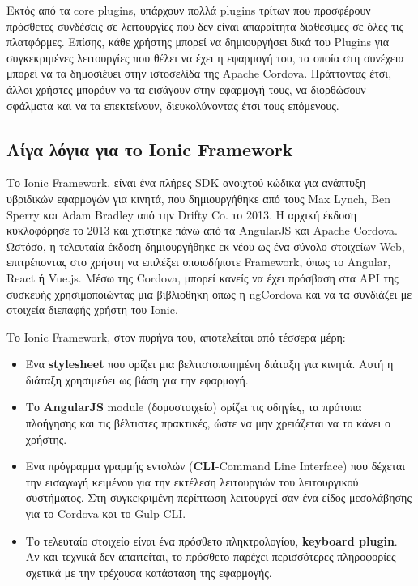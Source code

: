 \documentclass[a4paper,12pt]{article}
\begin{document}
			Εκτός από τα core plugins, υπάρχουν πολλά plugins τρίτων που προσφέρουν πρόσθετες συνδέσεις σε λειτουργίες που δεν είναι 
			απαραίτητα διαθέσιμες σε όλες τις πλατφόρμες. Επίσης, κάθε χρήστης μπορεί να δημιουργήσει δικά του Plugins για συγκεκριμένες λειτουργίες που θέλει να έχει
			η εφαρμογή του, τα οποία στη συνέχεια μπορεί να τα δημοσιέυει στην ιστοσελίδα της Apache Cordova. Πράττοντας έτσι, άλλοι χρήστες μπορόυν να τα εισάγουν
			στην εφαρμογή τους, να διορθώσουν σφάλματα και να τα επεκτείνουν, διευκολύνοντας έτσι τους επόμενους.
		\newpage
		\subsection{Λίγα λόγια για τo Ionic Framework}
			Το Ionic Framework, είναι ένα πλήρες SDK ανοιχτού κώδικα για ανάπτυξη υβριδικών εφαρμογών για κινητά, που δημιουργήθηκε από τους Max Lynch, Ben Sperry και Adam Bradley από την Drifty Co. το 
			2013. Η αρχική έκδοση κυκλοφόρησε το 2013 και χτίστηκε πάνω από τα AngularJS και Apache Cordova. Ωστόσο, η τελευταία έκδοση δημιουργήθηκε εκ νέου ως ένα σύνολο στοιχείων Web, 
			επιτρέποντας στο χρήστη να επιλέξει οποιοδήποτε Framework, όπως το Angular, React ή Vue.js. Μέσω της Cordova, μπορεί κανείς να έχει πρόσβαση στα API της συσκευής χρησιμοποιώντας 
			μια βιβλιοθήκη όπως η ngCordova και να τα συνδιάζει με στοιχεία διεπαφής χρήστη του Ionic.

			Το Ionic Framework, στον πυρήνα του, αποτελείται από τέσσερα μέρη:

			\begin{itemize}
				\item Ένα \textbf{stylesheet} που ορίζει μια βελτιστοποιημένη διάταξη για κινητά. Αυτή η διάταξη χρησιμεύει ως βάση για την εφαρμογή.
				
				\item Το \textbf{AngularJS} module (δομοστοιχείο) oρίζει τις οδηγίες, τα πρότυπα πλοήγησης και τις βέλτιστες πρακτικές, ώστε να μην χρειάζεται να το κάνει ο χρήστης.
				
				\item Ενα πρόγραμμα γραμμής εντολών (\textbf{CLI}-Command Line Interface) που δέχεται την εισαγωγή κειμένου για την εκτέλεση λειτουργιών του λειτουργικού συστήματος.
				Στη συγκεκριμένη περίπτωση λειτουργεί σαν ένα είδος μεσολάβησης για το Cordova και το Gulp CLI.
				
				\item Το τελευταίο στοιχείο είναι ένα πρόσθετο πληκτρολογίου, \textbf{keyboard plugin}. Αν και τεχνικά δεν απαιτείται, το πρόσθετο παρέχει περισσότερες πληροφορίες σχετικά με την τρέχουσα κατάσταση της εφαρμογής.
				
			\end{itemize}
\end{document}
